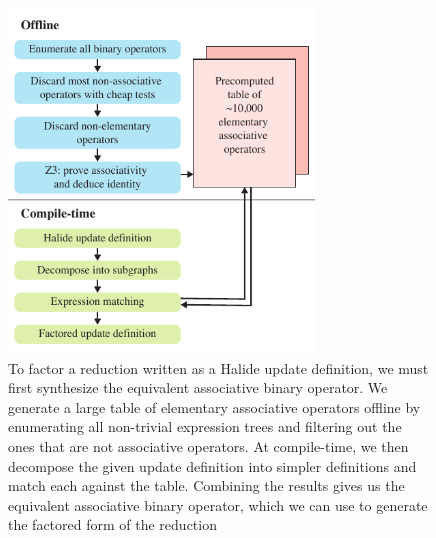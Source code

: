 \begin{figure}[tb]
\centering
\includegraphics[width=3.2in]{system}
\caption{To factor a reduction written as a Halide update definition, we must first synthesize the equivalent associative binary operator. We generate a large table of elementary associative operators offline by enumerating all non-trivial expression trees and filtering out the ones that are not associative operators. At compile-time, we then decompose the given update definition into simpler definitions and match each against the table. Combining the results gives us the equivalent associative binary operator, which we can use to generate the factored form of the reduction}
\label{fig:system}
\end{figure}
